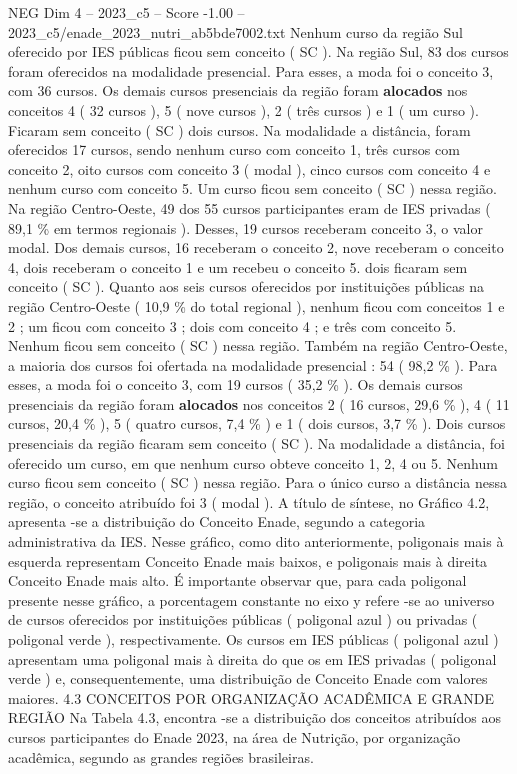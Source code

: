 \begin{textsample}{NEG Dim 4 – 2023\_c5 – Score -1.00 – 2023\_c5/enade\_2023\_nutri\_ab5bde7002.txt}
Nenhum curso da região Sul oferecido por IES públicas ficou sem conceito ( SC ).
Na região Sul, 83 dos cursos foram oferecidos na modalidade presencial.
Para esses, a moda foi o conceito 3, com 36 cursos.
Os demais cursos presenciais da região foram \textbf{alocados} nos conceitos 4 ( 32 cursos ), 5 ( nove cursos ), 2 ( três cursos ) e 1 ( um curso ).
Ficaram sem conceito ( SC ) dois cursos.
Na modalidade a distância, foram oferecidos 17 cursos, sendo nenhum curso com conceito 1, três cursos com conceito 2, oito cursos com conceito 3 ( modal ), cinco cursos com conceito 4 e nenhum curso com conceito 5.
Um curso ficou sem conceito ( SC ) nessa região.
Na região Centro-Oeste, 49 dos 55 cursos participantes eram de IES privadas ( 89,1 \% em termos regionais ).
Desses, 19 cursos receberam conceito 3, o valor modal.
Dos demais cursos, 16 receberam o conceito 2, nove receberam o conceito 4, dois receberam o conceito 1 e um recebeu o conceito 5. dois ficaram sem conceito ( SC ).
Quanto aos seis cursos oferecidos por instituições públicas na região Centro-Oeste ( 10,9 \% do total regional ), nenhum ficou com conceitos 1 e 2 ; um ficou com conceito 3 ; dois com conceito 4 ; e três com conceito 5.
Nenhum ficou sem conceito ( SC ) nessa região.
Também na região Centro-Oeste, a maioria dos cursos foi ofertada na modalidade presencial : 54 ( 98,2 \% ).
Para esses, a moda foi o conceito 3, com 19 cursos ( 35,2 \% ).
Os demais cursos presenciais da região foram \textbf{alocados} nos conceitos 2 ( 16 cursos, 29,6 \% ), 4 ( 11 cursos, 20,4 \% ), 5 ( quatro cursos, 7,4 \% ) e 1 ( dois cursos, 3,7 \% ).
Dois cursos presenciais da região ficaram sem conceito ( SC ).
Na modalidade a distância, foi oferecido um curso, em que nenhum curso obteve conceito 1, 2, 4 ou 5.
Nenhum curso ficou sem conceito ( SC ) nessa região.
Para o único curso a distância nessa região, o conceito atribuído foi 3 ( modal ).
A título de síntese, no Gráfico 4.2, apresenta -se a distribuição do Conceito Enade, segundo a categoria administrativa da IES.
Nesse gráfico, como dito anteriormente, poligonais mais à esquerda representam Conceito Enade mais baixos, e poligonais mais à direita Conceito Enade mais alto.
É importante observar que, para cada poligonal presente nesse gráfico, a porcentagem constante no eixo y refere -se ao universo de cursos oferecidos por instituições públicas ( poligonal azul ) ou privadas ( poligonal verde ), respectivamente.
Os cursos em IES públicas ( poligonal azul ) apresentam uma poligonal mais à direita do que os em IES privadas ( poligonal verde ) e, consequentemente, uma distribuição de Conceito Enade com valores maiores. 4.3 CONCEITOS POR ORGANIZAÇÃO ACADÊMICA E GRANDE REGIÃO Na Tabela 4.3, encontra -se a distribuição dos conceitos atribuídos aos cursos participantes do Enade 2023, na área de Nutrição, por organização acadêmica, segundo as grandes regiões brasileiras.

\end{textsample}
